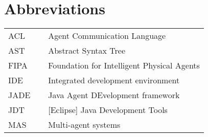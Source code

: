 \chapter*{Abbreviations}

\begin{flushleft}
\begin{tabular}{l p{0.8\linewidth}}
ACL		 & Agent Communication Language\\
AST		 & Abstract Syntax Tree\\
FIPA	 & Foundation for Intelligent Physical Agents\\
IDE 	 & Integrated development environment\\
JADE	 & Java Agent DEvelopment framework\\
JDT		 & [Eclipse] Java Development Tools \\
MAS      & Multi-agent systems\\

\end{tabular}
\end{flushleft}

